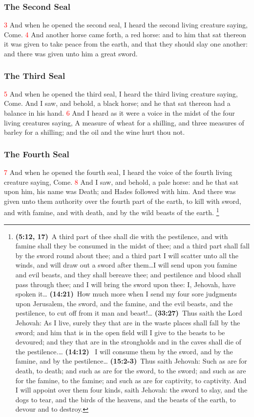 \documentclass[12pt,twoside]{memoir}
\newcommand{\cbibleref}[3]{\textbf{\ibibleverse[textit]{#1}(#2)}\ {#3}}
\newcommand{\cbiblechvs}[3]{\textbf{\ibiblechvs[textit]{#1}(#2)}\ {#3}}
\newcommand{\vnum}[1]{\textcolor{red}{\normalsize{#1}}}
\begin{document}
\subsubsection*{The Second Seal}
\vnum{3} And when he opened the second seal, I heard the second living creature saying, Come. %
\vnum{4} And another horse came forth, a red horse: and to him that sat thereon it was given to take peace from the earth, and that they should slay one another: and there was given unto him a great sword.
\subsubsection*{The Third Seal}
\vnum{5} And when he opened the third seal, I heard the third living creature saying, Come. And I saw, and behold, a black horse; and he that sat thereon had a balance in his hand. \vnum{6} And I heard as it were a voice in the midst of the four living creatures saying, A measure of wheat for a shilling, and three measures of barley for a shilling; and the oil and the wine hurt thou not.
\subsubsection*{The Fourth Seal}
\vnum{7} And when he opened the fourth seal, I heard the voice of the fourth living creature saying, Come. %
\vnum{8} And I saw, and behold, a pale horse: and he that sat upon him, his name was Death; and Hades followed with him. And there was given unto them authority over the fourth part of the earth, to kill with sword, and with famine, and with death, and by the wild beasts of the earth.
	\footnote{\cbibleref{Ezekiel}{5:12, 17}{A third part of thee shall die with the pestilence, and with famine shall they be consumed in the midst of thee; and a third part shall fall by the sword round about thee; and a third part I will scatter unto all the winds, and will draw out a sword after them\ldots I will send upon you famine and evil beasts, and they shall bereave thee; and pestilence and blood shall pass through thee; and I will bring the sword upon thee: I, Jehovah, have spoken it}\ldots%
			\cbiblechvs{Ezekiel}{14:21}{How much more when I send my four sore judgments upon Jerusalem, the sword, and the famine, and the evil beasts, and the pestilence, to cut off from it man and beast!}\ldots%
			\cbiblechvs{Ezekiel}{33:27}{Thus saith the Lord Jehovah: As I live, surely they that are in the waste places shall fall by the sword; and him that is in the open field will I give to the beasts to be devoured; and they that are in the strongholds and in the caves shall die of the pestilence.}\ldots%
			\cbibleref{Jeremiah}{14:12}{ I will consume them by the sword, and by the famine, and by the pestilence}\ldots%
			\cbiblechvs{Jeremiah}{15:2-3}{Thus saith Jehovah: Such as are for death, to death; and such as are for the sword, to the sword; and such as are for the famine, to the famine; and such as are for captivity, to captivity. And I will appoint over them four kinds, saith Jehovah: the sword to slay, and the dogs to tear, and the birds of the heavens, and the beasts of the earth, to devour and to destroy.}
			}%
\end{document}

